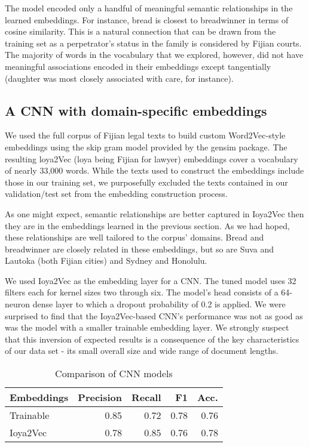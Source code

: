 \documentclass[twocolumn,10pt]{wmrDoc}
\begin{document}
The model encoded only a handful of meaningful semantic relationships in the learned embeddings.  For instance, bread is closest to breadwinner in terms of cosine similarity.  This is a natural connection that can be drawn from the training set as a perpetrator’s status in the family is considered by Fijian courts.  The majority of words in the vocabulary that we explored, however, did not have meaningful associations encoded in their embeddings except tangentially (daughter was most closely associated with care, for instance).

\subsection{A CNN with domain-specific embeddings}
We used the full corpus of Fijian legal texts to build custom Word2Vec-style embeddings using the skip gram model provided by the gensim package.  The resulting loya2Vec (loya being Fijian for lawyer) embeddings cover a vocabulary of nearly 33,000 words.  While the texts used to construct the embeddings include those in our training set, we purposefully excluded the texts contained in our validation/test set from the embedding construction process.

As one might expect, semantic relationships are better captured in Ioya2Vec then they are in the embeddings learned in the previous section.  As we had hoped, these relationships are well tailored to the corpus’ domains.  Bread and breadwinner are closely related in these embeddings, but so are Suva and Lautoka (both Fijian cities) and Sydney and Honolulu.

We used Ioya2Vec as the embedding layer for a CNN.  The tuned model uses 32 filters each for kernel sizes two through six.  The model’s head consists of a 64-neuron dense layer to which a dropout probability of 0.2 is applied.  We were surprised to find that the Ioya2Vec-based CNN’s performance was not as good as was the model with a smaller trainable embedding layer.  We strongly suspect that this inversion of expected results is a consequence of the key characteristics of our data set - its small overall size and wide range of document lengths.

\begin{table}
 \caption{Comparison of CNN models}
  \centering
  \begin{tabular}{lrrrr}
    \toprule
    Embeddings & Precision & Recall & F1 & Acc.\\
    \midrule
    Trainable   & 0.85 & 0.72 & 0.78  & 0.76 \\
    Ioya2Vec    & 0.78 & 0.85 & 0.76 & 0.78  \\
    \bottomrule
  \end{tabular}
  \label{tab:cnn}
\end{table}
\end{document}
